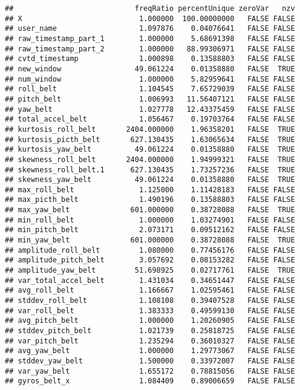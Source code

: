 \documentclass[]{article}
\begin{document}
\begin{verbatim}
##                            freqRatio percentUnique zeroVar   nzv
## X                           1.000000  100.00000000   FALSE FALSE
## user_name                   1.097876    0.04076641   FALSE FALSE
## raw_timestamp_part_1        1.000000    5.68691398   FALSE FALSE
## raw_timestamp_part_2        1.000000   88.99306971   FALSE FALSE
## cvtd_timestamp              1.000898    0.13588803   FALSE FALSE
## new_window                 49.061224    0.01358880   FALSE  TRUE
## num_window                  1.000000    5.82959641   FALSE FALSE
## roll_belt                   1.104545    7.65729039   FALSE FALSE
## pitch_belt                  1.006993   11.56407121   FALSE FALSE
## yaw_belt                    1.027778   12.43375459   FALSE FALSE
## total_accel_belt            1.056467    0.19703764   FALSE FALSE
## kurtosis_roll_belt       2404.000000    1.96358201   FALSE  TRUE
## kurtosis_picth_belt       627.130435    1.63065634   FALSE  TRUE
## kurtosis_yaw_belt          49.061224    0.01358880   FALSE  TRUE
## skewness_roll_belt       2404.000000    1.94999321   FALSE  TRUE
## skewness_roll_belt.1      627.130435    1.73257236   FALSE  TRUE
## skewness_yaw_belt          49.061224    0.01358880   FALSE  TRUE
## max_roll_belt               1.125000    1.11428183   FALSE FALSE
## max_picth_belt              1.490196    0.13588803   FALSE FALSE
## max_yaw_belt              601.000000    0.38728088   FALSE  TRUE
## min_roll_belt               1.000000    1.03274901   FALSE FALSE
## min_pitch_belt              2.073171    0.09512162   FALSE FALSE
## min_yaw_belt              601.000000    0.38728088   FALSE  TRUE
## amplitude_roll_belt         1.080000    0.77456176   FALSE FALSE
## amplitude_pitch_belt        3.057692    0.08153282   FALSE FALSE
## amplitude_yaw_belt         51.698925    0.02717761   FALSE  TRUE
## var_total_accel_belt        1.431034    0.34651447   FALSE FALSE
## avg_roll_belt               1.166667    1.02595461   FALSE FALSE
## stddev_roll_belt            1.108108    0.39407528   FALSE FALSE
## var_roll_belt               1.383333    0.49599130   FALSE FALSE
## avg_pitch_belt              1.000000    1.20260905   FALSE FALSE
## stddev_pitch_belt           1.021739    0.25818725   FALSE FALSE
## var_pitch_belt              1.235294    0.36010327   FALSE FALSE
## avg_yaw_belt                1.000000    1.29773067   FALSE FALSE
## stddev_yaw_belt             1.500000    0.33972007   FALSE FALSE
## var_yaw_belt                1.655172    0.78815056   FALSE FALSE
## gyros_belt_x                1.084409    0.89006659   FALSE FALSE

\end{verbatim}
\end{document}
